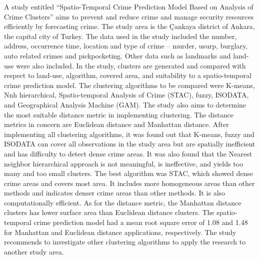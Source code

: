     A study entitled “Spatio-Temporal Crime Prediction Model Based on Analysis of Crime Clusters” \cite{polat2007spatio} aims to prevent and reduce crime and manage security resources efficiently by forecasting crime. The study area is the Çankaya district of Ankara, the capital city of Turkey. The data used in the study included the number, address, occurrence time, location and type of crime – murder, usurp, burglary, auto related crimes and pickpocketing. Other data such as landmarks and land-use were also included. In the study, clusters are generated and compared with respect to land-use, algorithm, covered area, and suitability to a spatio-temporal crime prediction model. The clustering algorithms to be compared were K-means, Nnh hierarchical, Spatio-temporal Analysis of Crime (STAC), fuzzy, ISODATA, and Geographical Analysis Machine (GAM). The study also aims to determine the most suitable distance metric in implementing clustering. The distance metrics in concern are Euclidean distance and Manhattan distance. After implementing all clustering algorithms, it was found out that K-means, fuzzy and ISODATA can cover all observations in the study area but are spatially inefficient and has difficulty to detect dense crime areas. It was also found that the Nearest neighbor hierarchical approach is not meaningful, is ineffective, and yields too many and too small clusters. The best algorithm was STAC, which showed dense crime areas and covers most area. It includes more homogeneous areas than other methods and indicates denser crime areas than other methods. It is also computationally efficient. As for the distance metric, the Manhattan distance clusters has lower surface area than Euclidean distance clusters. The spatio-temporal crime prediction model had a mean root square error of 1.08 and 1.48 for Manhattan and Euclidean distance applications, respectively. The study recommends to investigate other clustering algorithms to apply the research to another study area.

